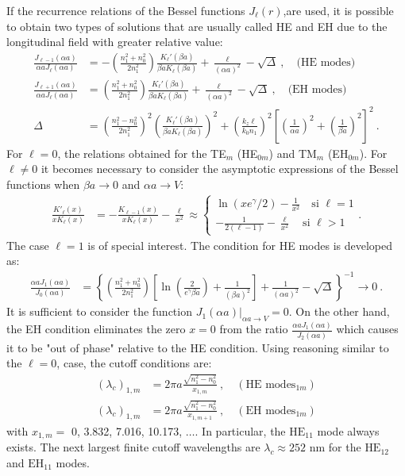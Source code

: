 If the recurrence relations of the Bessel functions $J_\ell(r)$,are used, it is possible to obtain two types of solutions that are usually called HE and EH due to the longitudinal field with greater relative value:
\begin{align}
		\frac{J_{\ell-1}(\alpha a)}{\alpha a J_\ell(\alpha a)} &= -\left(\frac{n_1^2+n_0^2}{2n_1^2}\right) \frac{K_\ell'(\beta a)}{\beta a K_\ell(\beta a)}+\frac{\ell}{(\alpha a)^2}-\sqrt{\Delta} \ , \quad \text{(HE modes)}
		\label{eqn:HE}
	\\
		\frac{J_{\ell+1}(\alpha a)}{\alpha a J_\ell(\alpha a)} &= \left(\frac{n_1^2+n_0^2}{2n_1^2}\right) \frac{K_\ell'(\beta a)}{\beta a K_\ell(\beta a)}+\frac{\ell}{(\alpha a)^2}-\sqrt{\Delta} \ , \quad \text{(EH modes)}
		\label{eqn:EH}
		\\
		\Delta &= \left(\frac{n_1^2-n_0^2}{2n_1^2}\right)^2\left(\frac{K_\ell'(\beta a)}{\beta a K_\ell(\beta a)}\right)^2+ \left( \frac{ k_z \ell}{ k_0 n_1} \right)^2\left[ \left(\frac{1}{\alpha a}\right)^2 + \left(\frac{1}{\beta a}\right)^2 \right]^2 \ . \nonumber
\end{align}
For $\ell = 0$,  the relations obtained for the TE$_m$ (HE$_{0m}$) and TM$_m$ (EH$_{0m}$). For $\ell \neq 0$ it becomes necessary to consider the asymptotic expressions of the Bessel functions when $\beta a \to 0$ and $\alpha a \to V$:
\begin{align*}
	\frac{K'_\ell (x)}{xK_\ell (x)} &= -\frac{K_{\ell-1} (x)}{xK_\ell (x)}-\frac{\ell}{x^2}\approx \left\{\begin{matrix}
	\ln(xe^\gamma/2)-\frac{1}{x^2} \quad\text{si }\ell = 1
	\\
	-\frac{
	1}{2(\ell-1)}-\frac{\ell}{x^2}\quad \text{si }\ell > 1
	\end{matrix}\right. .
\end{align*}
The case $\ell=1$ is of special interest. The condition for HE modes is developed as:
\begin{align*}
	\frac{\alpha a J_1(\alpha a)}{J_0(\alpha a)} &= \left\{\left(\frac{n_1^2+n_0^2}{2n_1^2}\right) \left[ \ln\left(\frac{2}{e^\gamma \beta a}\right)+\frac{1}{(\beta a)^2} \right]+\frac{1}{(\alpha a)^2}-\sqrt{\Delta}\right\}^{-1} \to 0 \ .
\end{align*}
It is sufficient to consider the function $J_1(\alpha a)|_{\alpha a \to V} = 0$. On the other hand, the EH condition eliminates the zero $x=0$ from the ratio $\frac{\alpha aJ_1(\alpha a)}{J_2(\alpha a)}$ which causes it to be "out of phase" relative to the HE condition. Using reasoning similar to the $\ell =0$, case, the cutoff conditions are:
\begin{align*}
	(\lambda_c)_{1,m} &= 2\pi a \frac{\sqrt{n_1^2 - n_0^2}}{x_{1,m}} \ ,  \quad \left(\text{HE modes}_{1m}\right)
	\\
	(\lambda_c)_{1,m} &= 2\pi a \frac{\sqrt{n_1^2 - n_0^2}}{x_{1,m+1}} \ , \quad \left(\text{EH modes}_{1m}\right)
\end{align*}
with $x_{1,m}=$ 0, 3.832,  7.016, 10.173, $\dots$. In particular, the $\text{HE}_{11}$ mode always exists. The next largest finite cutoff wavelengths are $\lambda_c \approx 252$ nm for the $\text{HE}_{12}$ and $\text{EH}_{11}$ modes.

